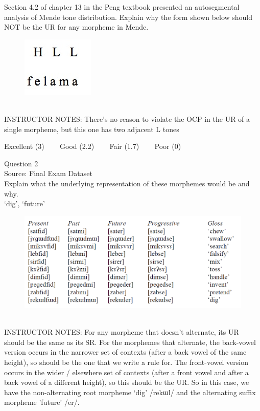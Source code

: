 \documentclass[12pt]{article}
\begin{document}
Section 4.2 of chapter 13 in the Peng textbook presented an autosegmental analysis of Mende tone distribution. Explain why the form shown below should NOT be the UR for any morpheme in Mende.\\

\begin{figure}[H]
\includegraphics{../images/mende_junction_b.png}
\end{figure}

~\\
INSTRUCTOR NOTES: There's no reason to violate the OCP in the UR of a single morpheme, but this one has two adjacent L tones


\vfill
Excellent (3) ~~~ Good (2.2) ~~~ Fair (1.7) ~~~ Poor (0)
\newpage

{\large Question 2}\\

Source: Final Exam Dataset\\

Explain what the underlying representation of these morphemes would be and why.\\

`dig', `future'

\begin{figure}[H]
\includegraphics{../images/final_dataset.png}
\end{figure}

~\\
INSTRUCTOR NOTES: For any morpheme that doesn’t alternate, its UR should be the same as its SR.  For the morphemes that alternate, the back-vowel version occurs in the narrower set of contexts (after a back vowel of the same height), so should be the one that we write a rule for. The front-vowel version occurs in the wider / elsewhere set of contexts (after a front vowel and after a back vowel of a different height), so this should be the UR. So in this case, we have the non-alternating root morpheme ‘dig’ /rekɯl/ and the alternating suffix morpheme 'future' /er/.
\end{document}
